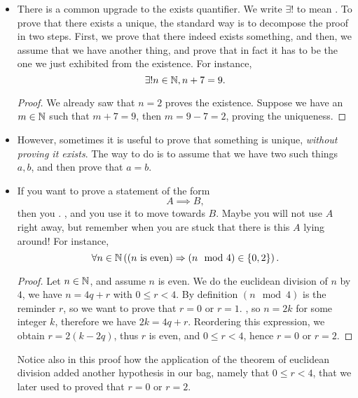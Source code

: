 \begin{itemize}
    \item There is a common upgrade to the exists quantifier. We write \( \exists! \) to mean . To prove that there exists a unique, the standard way is to decompose the proof in two steps. First, we prove that there indeed exists something, and then, we assume that we have another thing, and prove that in fact it has to be the one we just exhibited from the existence. For instance,
    \begin{equation*}
        \exists! n \in \mathbb{N}, n + 7 = 9.
    \end{equation*}
    \begin{proof}
        We already saw that \( n = 2 \) proves the existence. Suppose we have an \( m \in \mathbb{N} \) such that \( m + 7 = 9 \), then \( m = 9 - 7 = 2 \), proving the uniqueness.
    \end{proof}

    \item However, sometimes it is useful to prove that something is unique, \textit{without proving it exists}. The way to do is to assume that we have two such things \( a, b \), and then prove that \( a = b \).
    
    \item If you want to prove a statement of the form
    \begin{equation*}
        A \implies B,
    \end{equation*}
    then you . , and you use it to move towards \( B \). Maybe you will not use \( A \) right away, but remember when you are stuck that there is this \( A \) lying around! For instance,
    \begin{equation*}
        \forall n \in \mathbb{N} \left((n \text{ is even}) \Rightarrow (n \mod 4) \in \{ 0, 2 \} \right).
    \end{equation*}
    \begin{proof}
        Let \( n \in \mathbb{N} \), and assume \( n \) is even. We do the euclidean division of \( n \) by \( 4 \), we have \( n = 4q + r \) with \( 0 \le r < 4 \). By definition \( (n \mod 4) \) is the reminder \( r \), so we want to prove that \( r = 0 \) or \( r = 1 \). , so \( n = 2k \) for some integer \( k \), therefore we have \( 2k = 4q + r \). Reordering this expression, we obtain \( r = 2(k-2q) \), thus \( r \) is even, and \( 0 \le r < 4 \), hence \( r = 0 \) or \( r = 2 \).
    \end{proof}
    Notice also in this proof how the application of the theorem of euclidean division added another hypothesis in our bag, namely that \( 0 \le r < 4 \), that we later used to proved that \( r = 0 \) or \( r = 2 \).


\end{itemize}
